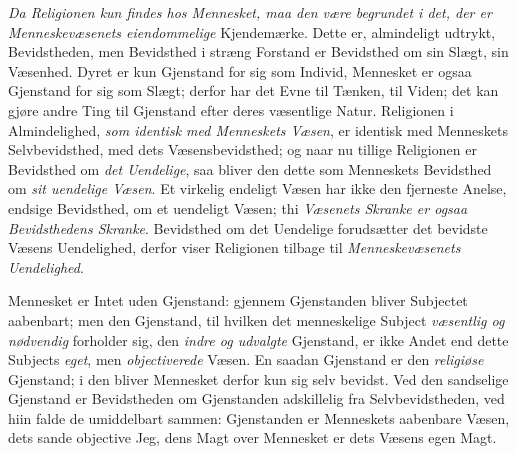 \emph{Da Religionen kun findes hos Mennesket, maa den være begrundet i det, der
er Menneskevæsenets eiendommelige} Kjendemærke. Dette er, almindeligt udtrykt,
Bevidstheden, men Bevidsthed i stræng Forstand er Bevidsthed om sin Slægt, sin
Væsenhed. Dyret er kun Gjenstand for sig som Individ, Mennesket er ogsaa
Gjenstand for sig som Slægt; derfor har det Evne til Tænken, til Viden; det kan
gjøre andre Ting til Gjenstand efter deres væsentlige Natur. Religionen i
Almindelighed, \emph{som identisk med Menneskets Væsen}, er identisk med
Menneskets Selvbevidsthed, med dets Væsensbevidsthed; og naar nu tillige
Religionen er Bevidsthed om \emph{det Uendelige}, saa bliver den dette som
Menneskets Bevidsthed om \emph{sit uendelige Væsen}. Et virkelig endeligt Væsen
har ikke den fjerneste Anelse, endsige Bevidsthed, om et uendeligt Væsen; thi
\emph{Væsenets Skranke er ogsaa Bevidsthedens Skranke}. Bevidsthed om det
Uendelige forudsætter det bevidste Væsens Uendelighed, derfor viser Religionen
tilbage til \emph{Menneskevæsenets Uendelighed}.

Mennesket er Intet uden Gjenstand: gjennem Gjenstanden bliver Subjectet
aabenbart; men den Gjenstand, til hvilken det menneskelige Subject
\emph{væsentlig og nødvendig} forholder sig, den \emph{indre og udvalgte}
Gjenstand, er ikke Andet end dette Subjects \emph{eget}, men
\emph{objectiverede}
 Væsen. En saadan Gjenstand er den \emph{religiøse} Gjenstand; i den bliver
Mennesket derfor kun sig selv bevidst. Ved den sandselige Gjenstand er
Bevidstheden om Gjenstanden adskillelig fra Selvbevidstheden, ved hiin falde de
umiddelbart sammen: Gjenstanden er Menneskets aabenbare Væsen, dets sande
objective Jeg, dens Magt over Mennesket er dets Væsens egen Magt.

